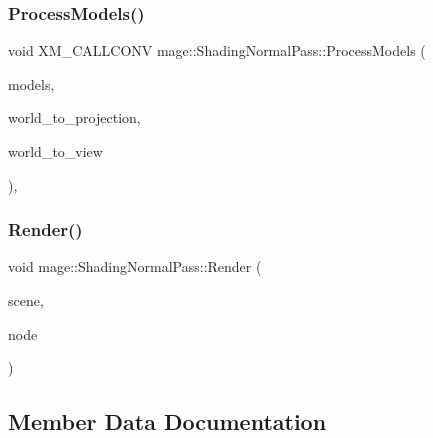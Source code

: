 \subsubsection{\texorpdfstring{Process\+Models()}{ProcessModels()}}
{\footnotesize\ttfamily void X\+M\+\_\+\+C\+A\+L\+L\+C\+O\+NV mage\+::\+Shading\+Normal\+Pass\+::\+Process\+Models (\begin{DoxyParamCaption}\item[{const vector$<$ const \hyperlink{classmage_1_1_model_node}{Model\+Node} $\ast$ $>$ \&}]{models,  }\item[{F\+X\+M\+M\+A\+T\+R\+IX}]{world\+\_\+to\+\_\+projection,  }\item[{F\+X\+M\+M\+A\+T\+R\+IX}]{world\+\_\+to\+\_\+view }\end{DoxyParamCaption})\hspace{0.3cm}{\ttfamily [private]}, {\ttfamily [noexcept]}}

\hypertarget{classmage_1_1_shading_normal_pass_ac4c404dd4b54fee222f652c1556fb9bf}{}\label{classmage_1_1_shading_normal_pass_ac4c404dd4b54fee222f652c1556fb9bf} 
\subsubsection{\texorpdfstring{Render()}{Render()}}
{\footnotesize\ttfamily void mage\+::\+Shading\+Normal\+Pass\+::\+Render (\begin{DoxyParamCaption}\item[{const \hyperlink{structmage_1_1_pass_buffer}{Pass\+Buffer} $\ast$}]{scene,  }\item[{const \hyperlink{classmage_1_1_camera_node}{Camera\+Node} $\ast$}]{node }\end{DoxyParamCaption})}



\subsection{Member Data Documentation}
\hypertarget{classmage_1_1_shading_normal_pass_aad8c7d37622cbd1dafd3dd49b590fd54}{}\label{classmage_1_1_shading_normal_pass_aad8c7d37622cbd1dafd3dd49b590fd54} 
